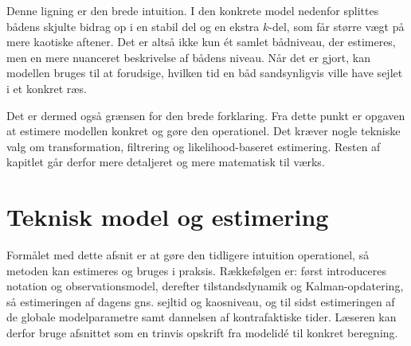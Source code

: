 Denne ligning er den brede intuition. I den konkrete model nedenfor splittes bådens skjulte bidrag op i en stabil del og en ekstra $k$-del, som får større vægt på mere kaotiske aftener. Det er altså ikke kun ét samlet bådniveau, der estimeres, men en mere nuanceret beskrivelse af bådens niveau. Når det er gjort, kan modellen bruges til at forudsige, hvilken tid en båd sandsynligvis ville have sejlet i et konkret ræs.

Det er dermed også grænsen for den brede forklaring. Fra dette punkt er opgaven at estimere modellen konkret og gøre den operationel. Det kræver nogle tekniske valg om transformation, filtrering og likelihood-baseret estimering. Resten af kapitlet går derfor mere detaljeret og mere matematisk til værks.

\newpage
\section{Teknisk model og estimering}

Formålet med dette afsnit er at gøre den tidligere intuition operationel, så metoden kan estimeres og bruges i praksis. Rækkefølgen er: først introduceres notation og observationsmodel, derefter tilstandsdynamik og Kalman-opdatering, så estimeringen af dagens gns. sejltid og kaosniveau, og til sidst estimeringen af de globale modelparametre samt dannelsen af kontrafaktiske tider. Læseren kan derfor bruge afsnittet som en trinvis opskrift fra modelidé til konkret beregning.

